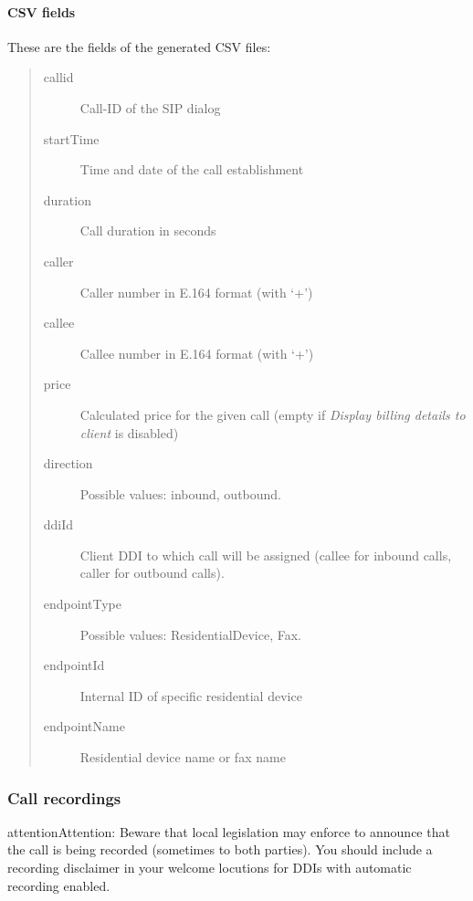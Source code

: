 \documentclass[letterpaper,10pt,english]{sphinxmanual}
\begin{document}
\paragraph{CSV fields}
\label{administration_portal/client/residential/calls/call_csv_schedulers:csv-fields}
These are the fields of the generated CSV files:
\begin{quote}
\begin{description}
\item[{callid}] \leavevmode
Call-ID of the SIP dialog

\item[{startTime}] \leavevmode
Time and date of the call establishment

\item[{duration}] \leavevmode
Call duration in seconds

\item[{caller}] \leavevmode
Caller number in E.164 format (with `+')

\item[{callee}] \leavevmode
Callee number in E.164 format (with `+')

\item[{price}] \leavevmode
Calculated price for the given call (empty if \emph{Display billing details to client} is disabled)

\item[{direction}] \leavevmode
Possible values: inbound, outbound.

\item[{ddiId}] \leavevmode
Client DDI to which call will be assigned (callee for inbound calls, caller for outbound calls).

\item[{endpointType}] \leavevmode
Possible values: ResidentialDevice, Fax.

\item[{endpointId}] \leavevmode
Internal ID of specific residential device

\item[{endpointName}] \leavevmode
Residential device name or fax name

\end{description}
\end{quote}


\subsubsection{Call recordings}
\label{administration_portal/client/residential/calls/call_recordings::doc}\label{administration_portal/client/residential/calls/call_recordings:call-recordings}
\begin{notice}{attention}{Attention:}
Beware that local legislation may enforce to announce that the
call is being recorded (sometimes to both parties). You should include
a recording disclaimer in your welcome locutions for DDIs with automatic
recording enabled.
\end{notice}
\end{document}
